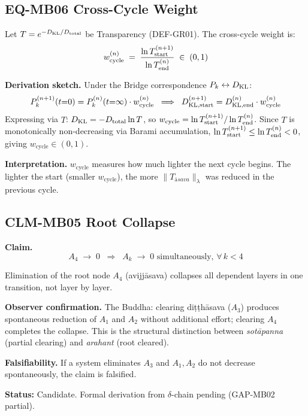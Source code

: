 \documentclass[12pt, a4paper]{article}
\providecommand{\Tasava}{T_{\bar{\mathrm{a}}sava}}
\providecommand{\wcyc}{w_{\mathrm{cycle}}}
\providecommand{\Tasava}{\mathcal{T}_{\!\mathrm{\bar{a}sava}}}
\begin{document}
\subsection{EQ-MB06 \quad Cross-Cycle Weight}


\begin{formalbox}[title={EQ-MB06: Cross-Cycle Weight
  $\wcyc$ (NEW v2)}]
Let $T = e^{-D_{\rm KL}/D_{\rm total}}$ be Transparency
(DEF-GR01). The cross-cycle weight is:
\[
  \wcyc^{(n)} \;=\;
  \frac{\ln T^{(n+1)}_{\rm start}}{\ln T^{(n)}_{\rm end}}
  \;\in\; (0,1)
\]

\textbf{Derivation sketch.}
Under the Bridge correspondence
$P_k \leftrightarrow D_{\rm KL}$:
\[
  P_k^{(n+1)}(t{=}0) = P_k^{(n)}(t{=}\infty)\cdot\wcyc^{(n)}
  \;\;\Longrightarrow\;\;
  D^{(n+1)}_{\rm KL,start} = D^{(n)}_{\rm KL,end}\cdot\wcyc^{(n)}
\]
Expressing via $T$: $D_{\rm KL} = -D_{\rm total}\ln T$,
so $\wcyc = \ln T^{(n+1)}_{\rm start} / \ln T^{(n)}_{\rm end}$.
Since $T$ is monotonically non-decreasing via Barami
accumulation, $\ln T^{(n+1)}_{\rm start} \leq
\ln T^{(n)}_{\rm end} < 0$, giving $\wcyc \in (0,1)$.

\textbf{Interpretation.}
$\wcyc$ measures how much lighter the next cycle begins.
The lighter the start (smaller $\wcyc$), the more
$\|\Tasava\|_\lambda$ was reduced in the previous cycle.
\end{formalbox}

\subsection{CLM-MB05 \quad Root Collapse}


\begin{formalbox}[title={CLM-MB05: Root Collapse
  (Candidate, NEW v2)}]
\textbf{Claim.}
\[
  A_4 \;\to\; 0 \;\;\Longrightarrow\;\;
  A_k \;\to\; 0 \text{ simultaneously, } \forall\,k < 4
\]

Elimination of the root node $A_4$ (avijj\={a}sava)
collapses all dependent layers in one transition, not
layer by layer.

\textbf{Observer confirmation.}
The Buddha: clearing di\d{t}\d{t}h\={a}sava ($A_3$)
produces spontaneous reduction of $A_1$ and $A_2$
without additional effort; clearing $A_4$ completes
the collapse. This is the structural distinction between
\textit{sot\={a}panna} (partial clearing) and
\textit{arahant} (root cleared).

\textbf{Falsifiability.}
If a system eliminates $A_3$ and $A_1, A_2$ do not
decrease spontaneously, the claim is falsified.

\textbf{Status:} Candidate. Formal derivation from
$\delta$-chain pending (GAP-MB02 partial).
\end{formalbox}
\end{document}
